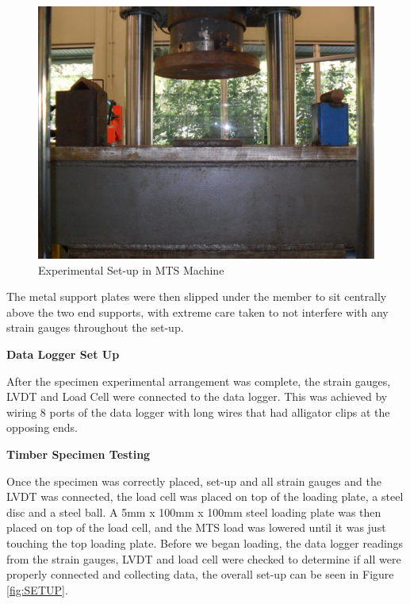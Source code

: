 \documentclass[11pt,a4paper]{article}
\numberwithin{equation}{subsection}
\begin{document}
\begin{figure}[h]
	\begin{center}
		\includegraphics[scale=0.1]{MTS_Set-up}
	\end{center}
	\caption{Experimental Set-up in MTS Machine}
	\label{fig:set_up}
\end{figure}
\pagebreak

\noindent
The metal support plates were then slipped under the member to sit centrally above the two end supports, with extreme care taken to not interfere with any strain gauges throughout the set-up. 

\vspace*{\baselineskip}

\noindent
\textbf{Data Logger Set Up}\par
\noindent
After the specimen experimental arrangement was complete, the strain gauges, LVDT and Load Cell were connected to the data logger. This was achieved by wiring 8 ports of the data logger with long wires that had alligator clips at the opposing ends.

\vspace*{\baselineskip}

\noindent
\textbf{Timber Specimen Testing}\par
\noindent
Once the specimen was correctly placed, set-up and all strain gauges and the LVDT was connected, the load cell was placed on top of the loading plate, a steel disc and a steel ball. A 5mm x 100mm x 100mm steel loading plate was then placed on top of the load cell, and the MTS load was lowered until it was just touching the top loading plate. Before we began loading, the data logger readings from the strain gauges, LVDT and load cell were checked to determine if all were properly connected and collecting data, the overall set-up can be seen in Figure \ref{fig:SETUP}.
\end{document}
